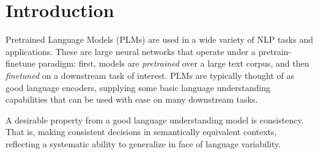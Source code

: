 \section{Introduction}
\label{sec:intro}

Pretrained Language Models (PLMs) are used in a wide variety of NLP tasks and applications. These are large neural networks that operate under a pretrain-finetune paradigm: first, models are \emph{pretrained} over a large text corpus, and then \emph{finetuned} on a downstream task of interest. PLMs are typically thought of as good language encoders, supplying some basic language understanding capabilities that can be used with ease on many downstream tasks.

A desirable property from  a good language understanding model is consistency. That is, making consistent decisions in semantically equivalent contexts, reflecting a systematic ability to generalize in face  of language variability.

